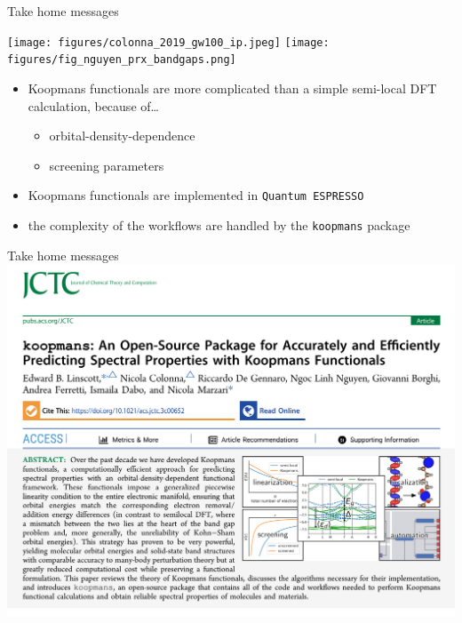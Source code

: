 \documentclass[xcolor=table,aspectratio=169]{beamer}
\numberwithin{equation}{section}
\begin{document}
\begin{frame}{Take home messages}

   \texttt{[image: figures/colonna\_2019\_gw100\_ip.jpeg]}
   \hfill
   \texttt{[image: figures/fig\_nguyen\_prx\_bandgaps.png]}
   \hfill

   \begin{itemize}
      \item Koopmans functionals are more complicated than a simple semi-local DFT calculation, because of\dots
      \begin{itemize}
         \item orbital-density-dependence
         \item screening parameters
      \end{itemize}
      \item Koopmans functionals are implemented in \texttt{Quantum ESPRESSO}
      \item the complexity of the workflows are handled by the \texttt{koopmans} package
   \end{itemize}

\end{frame}

\begin{frame}{Take home messages}
   \includegraphics[width=\textwidth]{figures/jctc.png}
\end{frame}
\end{document}
